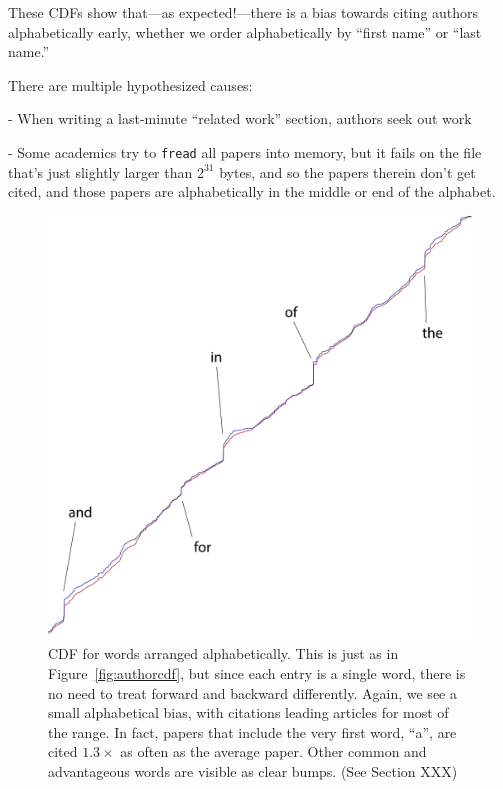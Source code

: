 \documentclass[twocolumn]{article}
\begin{document}
These CDFs show that---as expected!---there is a bias towards citing
authors alphabetically early, whether we order alphabetically by
``first name'' or ``last name.''

There are multiple hypothesized causes:

- When writing a last-minute ``related work'' section, authors seek
  out work 

- Some academics try to \verb+fread+ all papers into memory, but
  it fails on the file that's just slightly larger than $2^{31}$ bytes,
  and so the papers therein don't get cited, and those papers are
  alphabetically in the middle or end of the alphabet.

% 
% 

\begin{figure}
  \begin{center}
  \includegraphics[width=0.475 \textwidth]{wordstats}
  \end{center}
  \caption{ CDF for words arranged alphabetically. This is just as
    in Figure~\ref{fig:authorcdf}, but since each entry is a single
    word, there is no need to treat forward and backward differently.
    Again, we see a small alphabetical bias, with citations leading
    articles for most of the range. In fact, papers that include the
    very first word, ``a'', are cited $1.3\times$ as often as the
    average paper. Other common and advantageous words are visible
    as clear bumps. (See Section XXX)
  } \label{fig:wordcdf}
\end{figure}
\end{document}
